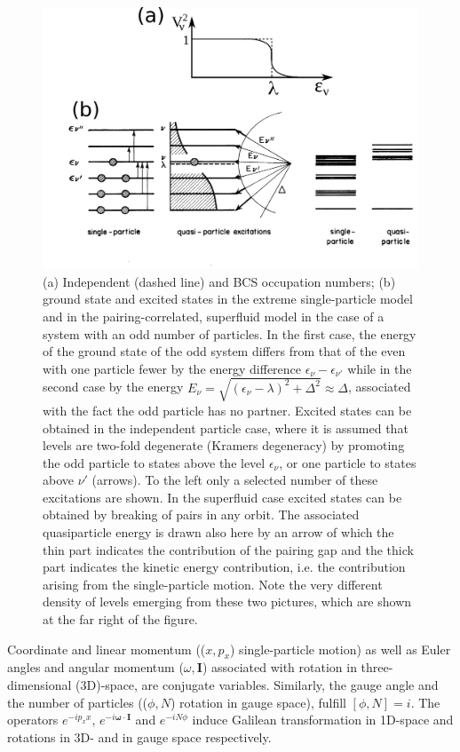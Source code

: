 \begin{figure}
	\centerline {
		\includegraphics*[width=15cm, angle=0.]{introduccion/figs/fig0_4_4_v2}
	}
	\caption{(a) Independent (dashed line) and BCS occupation numbers; (b) ground state and excited states in the extreme single-particle model and in the pairing-correlated, superfluid model in the case of a system with an odd number of particles. In the first case, the energy of the ground state of the odd system differs from that of the even with one particle fewer by the energy difference $\epsilon_\nu-\epsilon_{\nu'}$ while in the second case by the energy $E_\nu=\sqrt{(\epsilon_\nu-\lambda)^2+\Delta^2}\approx\Delta$, associated with the fact the odd particle has no partner. Excited states can be obtained in the independent particle case, where it is assumed that levels are two-fold degenerate (Kramers degeneracy) by promoting the odd particle to states above the level $\epsilon_\nu$, or one particle to  states above  $\nu'$ (arrows). To the left only a selected number of these excitations are shown. In the superfluid case excited states can be obtained by breaking of pairs in any orbit. The associated quasiparticle energy is drawn also here by an arrow of which the thin part indicates the contribution of the pairing gap and the thick part indicates the kinetic energy contribution, i.e. the contribution arising from the single-particle motion. Note the very different density of levels emerging from these two pictures, which are shown at the far right of the figure.}
	\label{fig0.4.3}
\end{figure}

Coordinate and linear momentum (($x,p_x$) single-particle motion) as well as Euler angles and angular momentum ($\omega,\mathbf I$) associated with rotation in three-dimensional (3D)-space,  are conjugate variables. Similarly, the gauge angle and the number of particles (($\phi,N$) rotation in gauge space), fulfill $[\phi,N]=i$. The operators $e^{-ip_xx}$, $e^{-i\pmb\omega\cdot\mathbf I}$ and $e^{-iN\phi}$ induce Galilean transformation in 1D-space and rotations in 3D- and in gauge space respectively. 

